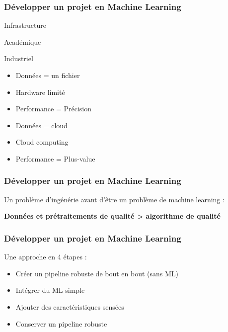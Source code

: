 \begin{frame}
  \frametitle{Développer un projet en Machine Learning}
  \begin{center}
    Infrastructure
  \end{center}
  \begin{minipage}[c]{0.49\linewidth}
    \begin{center}
      Académique
      \newline
    \end{center}
  \end{minipage}\hfill
  \begin{minipage}[c]{0.49\linewidth}
    \begin{center}
      Industriel
      \newline
    \end{center}
  \end{minipage}\hfill
  \begin{minipage}[c]{0.49\linewidth}
    \begin{itemize}
    \item Données = un fichier
    \item Hardware limité
    \item Performance = Précision
    \end{itemize}
  \end{minipage}\hfill
  \vrule{}
  \begin{minipage}[c]{0.49\linewidth}
    \begin{itemize}
    \item Données = cloud
    \item Cloud computing
    \item Performance = Plus-value
    \end{itemize}
  \end{minipage}\hfill
\end{frame}

\begin{frame}
  \frametitle{Développer un projet en Machine Learning}
  Un problème d'ingénérie avant d'être un problème de machine learning : \\
  \begin{center}
    \textbf{Données et prétraitements de qualité > algorithme de qualité}
  \end{center}
\end{frame}

\begin{frame}
  \frametitle{Développer un projet en Machine Learning}
  Une approche en 4 étapes :
  \begin{itemize}
  \item Créer un pipeline robuste de bout en bout (sans ML)
  \item Intégrer du ML simple
  \item Ajouter des caractéristiques sensées
  \item Conserver un pipeline robuste
  \end{itemize}
\end{frame}

